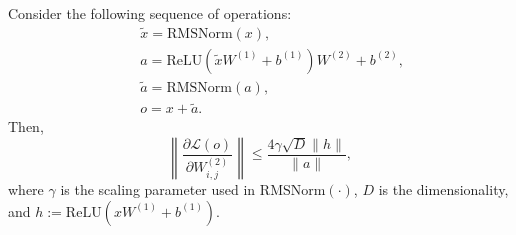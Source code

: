 \begin{proposition}
Consider the following sequence of operations:
\begin{align*}
    & \quad \tilde{x} = \mathrm{RMSNorm}(x), \\
    & \quad a = \mathrm{ReLU}(\tilde{x} W^{(1)} + b^{(1)})W^{(2)} + b^{(2)}, \\
    & \quad \tilde{a} = \mathrm{RMSNorm}(a), \\
    & \quad o = x + \tilde{a}.
\end{align*}
Then,
\begin{equation}
    \left\lVert \frac{\partial \mathcal{L}(o)}{\partial W_{i,j}^{(2)}} \right\rVert 
\leq  
\frac{4\gamma \sqrt{D} \| h \|}{\|a\|}, 
\end{equation}
where $\gamma$ is the scaling parameter used in $\mathrm{RMSNorm}(\cdot)$, $D$ is the dimensionality, and $h := \mathrm{ReLU}\left(x W^{(1)} + b^{(1)}\right)$.
\end{proposition}

